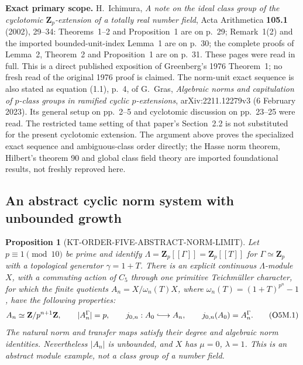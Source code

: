 \documentclass[11pt,a4paper]{article}
\newtheorem{proposition}[theorem]{Proposition}
\theoremstyle{definition}
\renewcommand{\paragraph}[1]{\par\smallskip\noindent\textbf{#1}\quad\ignorespaces}
\begin{document}
\paragraph{Exact primary scope.}
H.~Ichimura, \emph{A note on the ideal class group of the
cyclotomic $\mathbf Z_p$-extension of a totally real number
field}, Acta Arithmetica \textbf{105.1} (2002), 29--34:
Theorems~1--2 and Proposition~1 are on p.~29;
Remark~1(2) and the imported bounded-unit-index Lemma~1 are on
p.~30; the complete proofs of Lemma~2, Theorem~2 and
Proposition~1 are on p.~31.  These pages were read in full.
This is a direct published exposition of Greenberg's
1976 Theorem~1; no fresh read of the original 1976 proof is
claimed.  The norm-unit exact sequence is also stated as
equation (1.1), p.~4, of G.~Gras,
\emph{Algebraic norms and capitulation of $p$-class groups in
ramified cyclic $p$-extensions}, arXiv:2211.12279v3
(6 February 2023).  Its general setup on pp.~2--5 and
cyclotomic discussion on pp.~23--25 were read.
The restricted tame setting of that paper's Section~2.2 is
not substituted for the present cyclotomic extension.
The argument above proves the specialized exact sequence and
ambiguous-class order directly; the Hasse norm theorem,
Hilbert's theorem 90 and global class field theory are imported
foundational results, not freshly reproved here.



\subsection{An abstract cyclic norm system with unbounded growth}

\begin{proposition}[KT-ORDER-FIVE-ABSTRACT-NORM-LIMIT]
Let $p\equiv1\pmod {10}$ be prime and identify
$\Lambda=\mathbf Z_p[[\Gamma]]=\mathbf Z_p[[T]]$ for
$\Gamma\simeq\mathbf Z_p$ with a topological generator $\gamma=1+T$.
There is an explicit continuous $\Lambda$-module $X$, with a commuting
action of $C_5$ through one primitive Teichm\"uller character, for which
the finite quotients $A_n=X/\omega_n(T)X$, where
$\omega_n(T)=(1+T)^{p^n}-1$, have the following properties:
\[
 A_n\simeq\mathbf Z/p^{n+1}\mathbf Z,\qquad
 |A_n^{\Gamma}|=p,\qquad
 j_{0,n}:A_0\lhook\joinrel\longrightarrow A_n,
 \qquad j_{0,n}(A_0)=A_n^{\Gamma}.                     \tag{O5M.1}
\]
The natural norm and transfer maps satisfy their degree and algebraic
norm identities.  Nevertheless $|A_n|$ is unbounded, and $X$ has
$\mu=0$, $\lambda=1$.
This is an abstract module example, not a class group of a number field.
\end{proposition}
\end{document}
